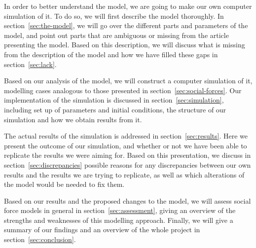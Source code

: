 In order to better understand the model, we are going to make our own computer 
simulation of it. To do so, we will first describe the model thoroughly. In 
section~\ref{sec:the-model}, we will go over the different parts and 
parameters of the model, and point out parts that are ambiguous or missing 
from the article presenting the model.  Based on this description, we will 
discuss what is missing from the description of the model and how we have 
filled these gaps in section~\ref{sec:lack}.

Based on our analysis of the model, we will construct a computer simulation of 
it, modelling cases analogous to those presented in 
section~\ref{sec:social-forces}. Our implementation of the 
simulation is discussed in section~\ref{sec:simulation}, including set up of 
parameters and initial conditions, the structure of our simulation and how we 
obtain results from it.

The actual results of the simulation is addressed in 
section~\ref{sec:results}. Here we present the outcome of our simulation, and 
whether or not we have been able to replicate the results we were aiming for.  
Based on this presentation, we discuss in section~\ref{sec:discrepancies} 
possible reasons for any discrepancies between our own results and the results 
we are trying to replicate, as well as which alterations of the model would 
be needed to fix them.

Based on our results and the proposed changes to the model, we will assess 
social force models in general in section~\ref{sec:assessment}, giving an 
overview of the strengths and weaknesses of this modelling approach. Finally, 
we will give a summary of our findings and an overview of the whole project in 
section~\ref{sec:conclusion}.
